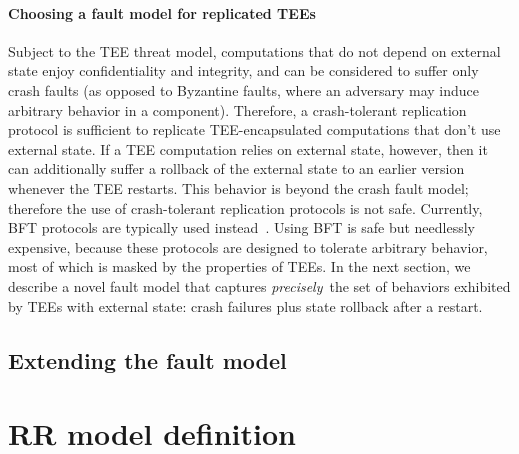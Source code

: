 \paragraph{Choosing a fault model for replicated \acp{TEE}}

Subject to the \ac{TEE} threat model, computations that do not depend on
external state enjoy confidentiality and integrity, and can be
considered to suffer only crash faults (as opposed to Byzantine
faults, where an adversary may induce arbitrary behavior in a
component). Therefore, a crash-tolerant replication protocol is sufficient
to replicate \ac{TEE}-encapsulated computations that don't use external
state.  If a \ac{TEE} computation relies on external state, however, then
it can additionally suffer a rollback of the external state to an
earlier version whenever the \ac{TEE} restarts.  This behavior is beyond
the crash fault model; therefore the use of crash-tolerant replication
protocols is not safe. Currently, \ac{BFT} protocols are typically used
instead~\cite{teechain,rote}.  Using \ac{BFT} is safe but needlessly
expensive, because these protocols are designed to tolerate arbitrary
behavior, most of which is masked by the properties of \acp{TEE}.
In the next section, we describe a novel fault model that
captures {\em precisely}\ the set of behaviors exhibited by \acp{TEE} with
external state: crash failures plus state rollback after a restart.

\subsection{Extending the fault model}\label{sec:extending_fault_model}


\section{\ac{RR} model definition}\label{sec:model}


